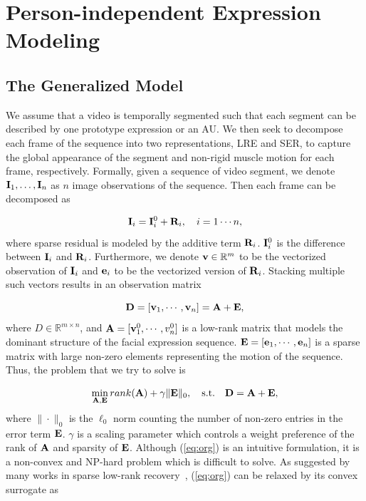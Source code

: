 \documentclass[journal]{IEEEtran}
\begin{document}
\section{Person-independent Expression Modeling\label{sec:decompose}}

\subsection{The Generalized Model} 
We assume that a video is temporally segmented such that each segment can be described by one prototype expression or an AU. We then seek to decompose each frame of the sequence into two representations, LRE and SER, to capture the global appearance of the segment and non-rigid muscle motion for each frame, respectively. Formally, given a sequence of video segment, we denote ${\bf I}_1, \ldots, {\bf I}_n$ as $n$ image observations of the sequence. Then each frame can be decomposed as

\begin{equation}
{\bf I}_i = {\bf I}^{0}_i + {\bf R}_i,\quad i = 1\cdots n,
\end{equation}
where sparse residual is modeled by the additive term ${\bf R}_i$. ${\bf I}^{0}_i$ is the difference between ${\bf I}_i$ and ${\bf R}_i$. Furthermore, we denote ${\bf v}\in\mathbb{R}^{m}$ to be the vectorized observation of ${\bf I}_i$ and ${\bf e}_i$ to be the vectorized version of ${\bf R}_i$. Stacking multiple such vectors results in an observation matrix

\begin{equation}
{\bf D} = [{\bf v}_1,  \cdots, {\bf v}_n] = {\bf A} + {\bf E},
\end{equation}
where $D\in\mathbb{R}^{m\times n}$, and ${\bf A} = [{\bf v}^{0}_{1}, \cdots, v^{0}_{n}]$ is a low-rank matrix that models the dominant structure of the facial expression sequence. ${\bf E} = [{\bf e}_{1}, \cdots, {\bf e}_{n}]$ is a sparse matrix with large non-zero elements representing the motion of the sequence. Thus, the problem that we try to solve is

\begin{equation} \label{eq:org}
\min_{\A,\E} rank(\A)+\gamma \|\E\|_0,  \quad \text{s.t.} \quad \D = \A + \E, 
\end{equation}
where $\|\cdot\|_0$ is the $\ell_0$ norm counting the number of non-zero entries in the error term ${\bf E}$. $\gamma$ is a scaling parameter which controls a weight preference of the rank of ${\bf A}$ and sparsity of ${\bf E}$. Although (\ref{eq:org}) is an intuitive formulation, it is a non-convex and NP-hard problem which is difficult to solve. As suggested by many works in sparse low-rank recovery~\cite{Candes11,Lin09,Peng_CVPR10}, (\ref{eq:org}) can be relaxed by its convex surrogate as
\end{document}
